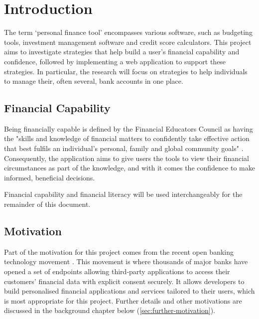 \chapter{Introduction}
\label{ch:introduction}
The term `personal finance tool' encompasses various software, such as budgeting tools, investment management software and credit score calculators. This project aims to investigate strategies that help build a user's financial capability and confidence, followed by implementing a web application to support these strategies. In particular, the research will focus on strategies to help individuals to manage their, often several, bank accounts in one place.

\section{Financial Capability}
Being financially capable is defined by the Financial Educators Council as having the "skills and knowledge of financial matters to confidently take effective action that best fulfils an individual's personal, family and global community goals" \cite{FinancialEducatorsCouncil}. Consequently, the application aims to give users the tools to view their financial circumstances as part of the knowledge, and with it comes the confidence to make informed, beneficial decisions.

Financial capability and financial literacy will be used interchangeably for the remainder of this document.

\section{Motivation}
Part of the motivation for this project comes from the recent open banking technology movement \cite{OpenBanking}. This movement is where thousands of major banks have opened a set of endpoints allowing third-party applications to access their customers' financial data with explicit consent securely. It allows developers to build personalised financial applications and services tailored to their users, which is most appropriate for this project. Further details and other motivations are discussed in the background chapter below (\ref{sec:further-motivation}).
